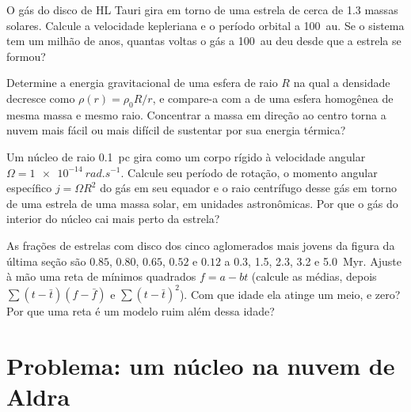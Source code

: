 \begin{exercise}[$\star\star$]\label{exo:b2:ism-star-formation:9}
O gás do disco de HL Tauri gira em torno de uma estrela de cerca de \num{1.3} massas
solares. Calcule a velocidade kepleriana e o período orbital a \qty{100}{au}.
Se o sistema tem um milhão de anos, quantas voltas o gás a
\qty{100}{au} deu desde que a estrela se formou?
\end{exercise}

\begin{exercise}[$\star\star\star$]\label{exo:b2:ism-star-formation:10}
Determine a energia gravitacional de uma esfera de raio $R$ na qual a densidade
decresce como $\rho(r) = \rho_0 R/r$, e compare-a com a de uma esfera homogênea de
mesma massa e mesmo raio. Concentrar a massa em direção ao centro torna
a nuvem mais fácil ou mais difícil de sustentar por sua energia térmica?
\end{exercise}

\begin{exercise}[$\star\star\star$]\label{exo:b2:ism-star-formation:11}
Um núcleo de raio \qty{0.1}{pc} gira como um corpo rígido à velocidade angular
$\Omega = \qty{1e-14}{rad.s^{-1}}$. Calcule seu período de rotação, o momento angular
específico $j = \Omega R^2$ do gás em seu equador e o raio centrífugo
desse gás em torno de uma estrela de uma massa solar, em unidades astronômicas.
Por que o gás do interior do núcleo cai mais perto da estrela?
\end{exercise}

\begin{exercise}[$\star\star\star$]\label{exo:b2:ism-star-formation:12}
As frações de estrelas com disco dos cinco aglomerados mais jovens da figura da última
seção são $0.85$, $0.80$, $0.65$, $0.52$ e $0.12$ a 0.3, 1.5, 2.3, 3.2 e
\qty{5.0}{Myr}. Ajuste à mão uma reta de mínimos quadrados $f = a - bt$
(calcule as médias, depois $\sum(t - \bar t)(f - \bar f)$ e
$\sum(t - \bar t)^2$). Com que idade ela atinge um meio, e zero? Por que uma
reta é um modelo ruim além dessa idade?
\end{exercise}

\section{Problema: um núcleo na nuvem de Aldra}


